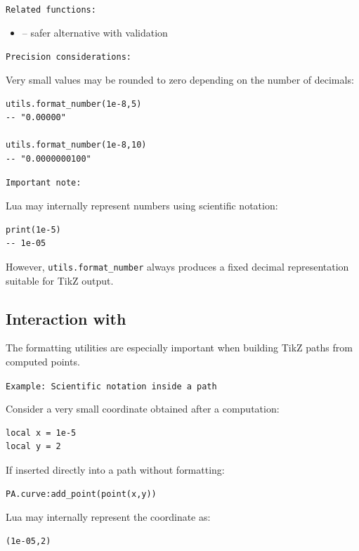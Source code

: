 \medskip
\texttt{Related functions: }

\begin{itemize}
\item {} – safer alternative with validation
\end{itemize}

\medskip
\texttt{Precision considerations: }

Very small values may be rounded to zero depending on the number of decimals:

\begin{verbatim}
utils.format_number(1e-8,5)
-- "0.00000"

utils.format_number(1e-8,10)
-- "0.0000000100"
\end{verbatim}

\texttt{Important note: }

Lua may internally represent numbers using scientific notation:

\begin{verbatim}
print(1e-5)
-- 1e-05
\end{verbatim}

However, \verb|utils.format_number| always produces a fixed decimal
representation suitable for TikZ output.

\subsection{Interaction with }

The formatting utilities are especially important when building
TikZ paths from computed points.

\texttt{Example: Scientific notation inside a path}

Consider a very small coordinate obtained after a computation:

\begin{verbatim}
local x = 1e-5
local y = 2
\end{verbatim}

If inserted directly into a path without formatting:

\begin{verbatim}
PA.curve:add_point(point(x,y))
\end{verbatim}

Lua may internally represent the coordinate as:

\begin{verbatim}
(1e-05,2)
\end{verbatim}

